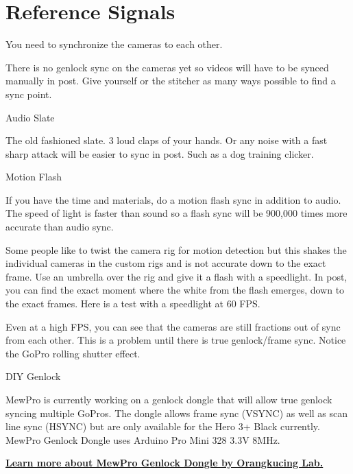 \chapter{Reference Signals}
\pagecolor{white}
\label{chap:22}
\begin{fullwidth}


\problem

{\large You need to synchronize the cameras to each other. \par}

There is no genlock sync on the cameras yet so videos will have to be synced manually in post. Give yourself or the stitcher as many ways possible to find a sync point. 

\solution

{\large Audio Slate \par}

The old fashioned slate. 3 loud claps of your hands. Or any noise with a fast sharp attack will be easier to sync in post. Such as a dog training clicker.

{\large Motion Flash \par}

If you have the time and materials, do a motion flash sync in addition to audio. The speed of light is faster than sound so a flash sync will be 900,000 times more accurate than audio sync. 

Some people like to twist the camera rig for motion detection but this shakes the individual cameras in the custom rigs and is not accurate down to the exact frame. 
Use an umbrella over the rig and give it a flash with a speedlight. In post, you can find the exact moment where the white from the flash emerges, down to the exact frames. 
\clearpage
Here is a test with a speedlight at 60 FPS. 


Even at a high FPS, you can see that the cameras are still fractions out of sync from each other. This is a problem until there is true genlock/frame sync. Notice the GoPro rolling shutter effect. 

{\large DIY Genlock \par}

MewPro is currently working on a genlock dongle that will allow true genlock syncing multiple GoPros. The dongle allows frame sync (VSYNC) as well as scan line sync (HSYNC) but are only available for the Hero 3+ Black currently. MewPro Genlock Dongle uses Arduino Pro Mini 328 3.3V 8MHz.

\textbf{\href{http://mewpro.cc/2015/03/20/how-to-use-mewpro-genlock-dongle/}{Learn more about MewPro Genlock Dongle by Orangkucing Lab.}}


\clearpage
\end{fullwidth}
